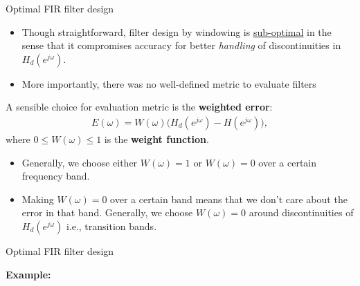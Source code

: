 \documentclass[10pt]{beamer}
\begin{document}
\begin{frame}{Optimal FIR filter design}
\begin{itemize}
	\item Though straightforward, filter design by windowing is \underline{sub-optimal} in the sense that it compromises accuracy for better \textit{handling} of discontinuities in $H_d(e^{j\omega})$.
	\item More importantly, there was no well-defined metric to evaluate filters
\end{itemize}
	\vspace{0.25cm}
	
	A sensible choice for evaluation metric is the \textbf{weighted error}:
	\begin{align*}
		E(\omega) = W(\omega)\Big(H_d(e^{j\omega}) - H(e^{j\omega})\Big), \tag{weighted error}
	\end{align*}
	where $0 \leq W(\omega) \leq 1$ is the \textbf{weight function}. 
	\vspace{0.25cm}
	
	\begin{itemize}
		\item Generally, we choose either $W(\omega) = 1$ or $W(\omega) = 0$ over a certain frequency band.
		\item Making $W(\omega) = 0$ over a certain band means that we don't care about the error in that band. Generally, we choose $W(\omega) = 0$ around discontinuities of $H_d(e^{j\omega})$ i.e., transition bands.
	\end{itemize}	
\end{frame}

\begin{frame}{Optimal FIR filter design}

	\textbf{Example:}
		
	\begin{center}
		\def\CARE{1}
		\resizebox{0.9\linewidth}{!}{}
	\end{center}
\end{frame}
\end{document}
